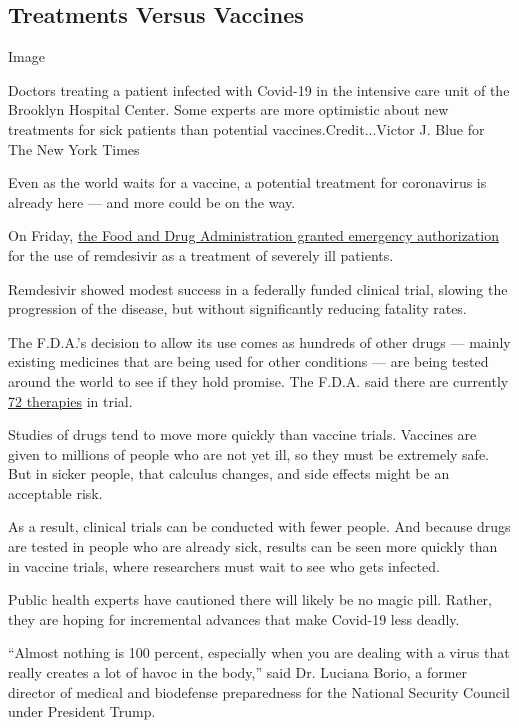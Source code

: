 \hypertarget{treatments-versus-vaccines}{%
\subsection{Treatments Versus
Vaccines}\label{treatments-versus-vaccines}}

Image

Doctors treating a patient infected with Covid-19 in the intensive care
unit of the Brooklyn Hospital Center. Some experts are more optimistic
about new treatments for sick patients than potential
vaccines.Credit...Victor J. Blue for The New York Times

Even as the world waits for a vaccine, a potential treatment for
coronavirus is already here --- and more could be on the way.

On Friday,
\href{https://www.nytimes3xbfgragh.onion/2020/05/01/health/coronavirus-remdesivir.html}{the
Food and Drug Administration granted emergency authorization} for the
use of remdesivir as a treatment of severely ill patients.

Remdesivir showed modest success in a federally funded clinical trial,
slowing the progression of the disease, but without significantly
reducing fatality rates.

The F.D.A.'s decision to allow its use comes as hundreds of other drugs
--- mainly existing medicines that are being used for other conditions
--- are being tested around the world to see if they hold promise. The
F.D.A. said there are currently
\href{https://www.fda.gov/drugs/coronavirus-covid-19-drugs/coronavirus-treatment-acceleration-program-ctap}{72
therapies} in trial.

Studies of drugs tend to move more quickly than vaccine trials. Vaccines
are given to millions of people who are not yet ill, so they must be
extremely safe. But in sicker people, that calculus changes, and side
effects might be an acceptable risk.

As a result, clinical trials can be conducted with fewer people. And
because drugs are tested in people who are already sick, results can be
seen more quickly than in vaccine trials, where researchers must wait to
see who gets infected.

Public health experts have cautioned there will likely be no magic pill.
Rather, they are hoping for incremental advances that make Covid-19 less
deadly.

``Almost nothing is 100 percent, especially when you are dealing with a
virus that really creates a lot of havoc in the body,'' said Dr. Luciana
Borio, a former director of medical and biodefense preparedness for the
National Security Council under President Trump.

